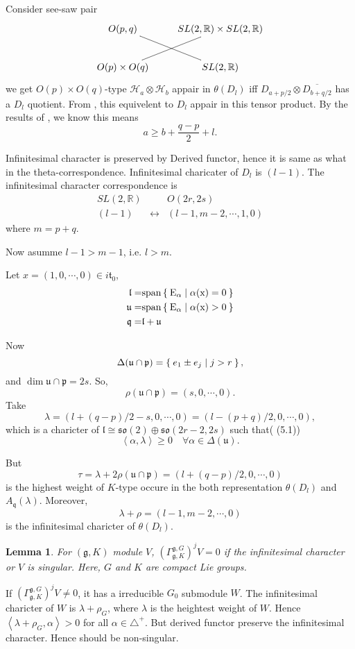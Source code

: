 \documentclass[12pt]{article}
\newtheorem{lemma}{Lemma}
\def\bR{{\mathbb{R}}}
\def\sspan{\rm{span}}
\def\inn#1#2{\left\langle{#1},{#2}\right\rangle}
\def\aso{\mathfrak{so}}
\def\fuu{\mathfrak{u}}
\def\fll{\mathfrak{l}}
\def\fpp{\mathfrak{p}}
\def\fqq{\mathfrak{q}}
\def\ftt{\mathfrak{t}}
\def\fgg{\mathfrak{g}}
\def\chh{\mathcal{H}}
\begin{document}
Consider see-saw pair 
\[
\xymatrix{
O(p,q) \ar@{-}[dr]& SL(2,\bR)\times SL(2,\bR) \\
O(p)\times O(q)\ar@{-}[ur] & SL(2,\bR)}
\] 
we get $O(p)\times O(q)$-type
 $\chh_a\otimes \chh_b$ appair in $\theta(D_{l})$ 
iff $D_{a+p/2}\otimes \overline{D_{b+q/2}}$ has a $D_{l}$ quotient.
From \cite{Howe1979Opq},
this equivelent to $D_{l}$ appair in this tensor product. 
By the results of \cite{Repka1976tensor}, we know this means
\[
a \geq b + \frac{q-p}{2} + l.
\]


Infinitesimal character is preserved by Derived functor, hence it is same as 
what in the theta-correspondence.
Infinitesimal charicater of $D_l$ is $(l-1)$. 
The infinitesimal character correspondence is 
\[
\begin{matrix}
 SL(2,\bR) & & O(2r,2s)\\
 (l-1) & \leftrightarrow & (l-1, m-2, \cdots, 1, 0)
\end{matrix}
\]
where $m=p+q$.

Now asumme $l-1>m-1$, i.e. $l>m$.

Let $x = (1, 0,\cdots, 0)\in i\ftt_0$,
\begin{align*}
\fll =& \sspan \Set{E_\alpha |\alpha(x) =0 }\\
\fuu =& \sspan \Set{E_\alpha |\alpha(x) >0 }\\
\fqq =& \fll+\fuu
\end{align*}

Now 
\[
\Delta(\fuu\cap \fpp) = \Set{e_1\pm e_j|j>r},
\]
and $\dim \fuu\cap \fpp = 2s$.
So, 
\[
\rho(\fuu\cap \fpp) = (s, 0, \cdots, 0).
\]
Take
\[
\lambda = (l+(q-p)/2-s, 0, \cdots, 0)=(l-(p+q)/2,0,\cdots, 0),
\]
which is a charicter of $\fll\cong \aso(2)\oplus \aso(2r-2,2s)$ 
such that(\cite{VoganZuckerman1984} (5.1))
\[
\inn{\alpha}{\lambda} \geq 0 \quad \forall \alpha \in \Delta(\fuu).
\]

But
\[
\tau = \lambda+2\rho(\fuu\cap\fpp) = (l+(q-p)/2, 0,\cdots, 0)
\]
is the highest weight of $K$-type occure in the both representation 
$\theta(D_l)$ and $A_\fqq(\lambda)$.
Moreover,
\[
\lambda + \rho = (l-1, m-2, \cdots, 0)
\]
is the infinitesimal charicter of $\theta(D_l)$. 

\begin{lemma}
For $(\fgg,K)$ module $V$, $\left(\Gamma_{\fgg,K}^{\fgg,G}\right)^j V = 0$ if the infinitesimal
character or $V$ is singular. Here, $G$ and $K$ are compact Lie groups.
\end{lemma}
\proof
If $(\Gamma_{\fgg,K}^{\fgg,G})^j V\neq 0$, it has a irreducible $G_0$ submodule $W$. 
The infinitesimal charicter of $W$ is $\lambda + \rho_G$, where $\lambda$ 
is the heightest weight of $W$. Hence $\inn{\lambda+\rho_G}{\alpha}>0$ for all
$\alpha\in \triangle^+$. But derived functor preserve 
the infinitesimal character. Hence should be non-singular.
\end{document}
